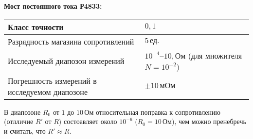 \textbf{Мост постоянного тока Р4833:}
\begin{table}[h!]
    \begin{tabular}{|l|l|}
    \hline
    Класс точности                                & $0{,}1$                                               \\ \hline
    Разрядность магазина сопротивлений            & $5\,\text{ед.}$                                       \\ \hline
    Исследуемый диапозон измерений                & $10^{-4}$--$10,\text{Ом}$ (для множителя $N=10^{-2}$) \\ \hline
    Погрешность измерений в исследуемом диапозоне & $\pm 10\,\text{мОм}$                                  \\ \hline
    \end{tabular}
\end{table}

В диапозоне $R_0$ от $1$ до $10\,\text{Ом}$ относительная поправка к сопротивлению (отлличие $R'$ от $R$)
состоавляет около $10^{-6}$ ($R_0 = 10\,\text{Ом}$), чем можно пренебречь и считать, что $R'\approx R$.
